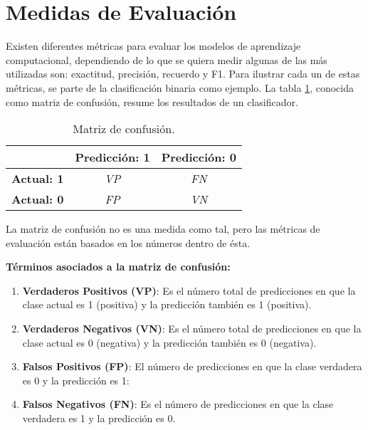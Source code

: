 \section{Medidas de Evaluación}

Existen diferentes métricas para evaluar los modelos de aprendizaje computacional, dependiendo de lo que se quiera medir algunas de las más utilizadas son: exactitud, precisión, recuerdo y F1. Para ilustrar cada un de estas métricas, se parte de la clasificación binaria como ejemplo. La tabla \ref{table:confusion}, conocida como matriz de confusión, resume  los resultados de un clasificador.

\begin{table}[ht]
\caption{Matriz de confusión.}
\label{table:confusion} 
\centering 
\begin{small}
\begin{tabular}{l|c|c|}
\cline{2-3}
                                         & \multicolumn{1}{l|}{\textbf{Predicción: 1}} & \multicolumn{1}{l|}{\textbf{Predicción: 0}} \\ \hline
\multicolumn{1}{|l|}{\textbf{Actual: 1}} & \textit{VP}                                 & \textit{FN}                                 \\ \hline
\multicolumn{1}{|l|}{\textbf{Actual: 0}} & \textit{FP}                                 & \textit{VN}                                 \\ \hline
\end{tabular}
\end{small}
\end{table}


La matriz de confusión no es una medida como tal, pero las métricas de evaluación están basados en los números dentro de ésta.

\textbf{Términos asociados a la matriz de confusión:}

\begin{enumerate}
    \item \textbf{Verdaderos Positivos (VP)}: Es el número total de predicciones en que la clase actual es 1 (positiva) y la predicción también es 1 (positiva).
    \item \textbf{Verdaderos Negativos (VN)}: Es el número total de predicciones en que la clase actual es 0 (negativa) y la predicción también es 0 (negativa).
    \item \textbf{Falsos Positivos (FP)}: El número de predicciones en que la clase verdadera es 0 y la predicción es 1:
    \item \textbf{Falsos Negativos (FN)}: Es el número de predicciones en que la clase verdadera es 1 y la predicción es 0.
\end{enumerate}


